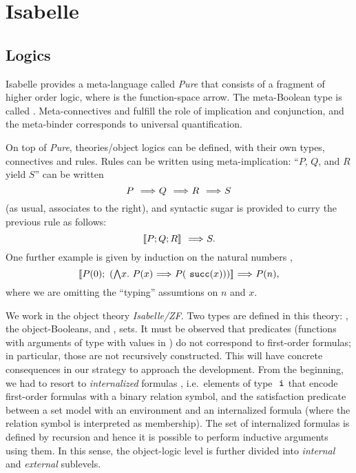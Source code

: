 \section{Isabelle}
\label{sec:isabelle}
\subsection{Logics}
\label{sec:logics}
Isabelle \cite{Isabelle,DBLP:books/sp/Paulson94} provides a
meta-language called \emph{Pure} that consists of a fragment of higher
order logic, where \isatt{\isasymRightarrow} is the function-space
arrow. The meta-Boolean type is called . Meta-connectives
\isatt{\isasymLongrightarrow} and \isatt{\&\&\&} fulfill the role of
implication and conjunction, and the meta-binder \isatt{\isasymAnd}
corresponds to universal quantification.

On top of \emph{Pure}, theories/object logics can be defined, with
their own types, connectives and rules. Rules can be written  using
meta-implication: ``$P$, $Q$, and $R$ yield $S$'' can be written
\[
P \ \isatt{\isasymLongrightarrow}\ Q\ \isatt{\isasymLongrightarrow}\ R\ \isatt{\isasymLongrightarrow}\ S
\]
(as usual,  \isatt{\isasymLongrightarrow} associates to the right), and
syntactic sugar is provided to curry the previous rule as follows:
\[
\isasymlbrakk P; Q; R \isasymrbrakk \ \isatt{\isasymLongrightarrow}\ S.
\]
One further example is given by induction on the natural numbers
,
\[
\isasymlbrakk P(0);\ (\textstyle\isasymAnd
x.\ P(x)\ \isasymLongrightarrow\ P(\isatt{succ}(x))) \isasymrbrakk
\ \isasymLongrightarrow\ P(n), 
\]
where we are omitting the ``typing'' assumtions on $n$ and $x$.

We work in the object theory \emph{Isabelle/ZF}. Two types are defined
in this theory: \tyo, the object-Booleans, and \tyi,
sets. 
It must be observed that predicates (functions with arguments of
type \tyi{} with values in \tyo) do not correspond to first-order formulas;
in particular, those are not recursively constructed.
This will
have concrete consequences in our strategy to approach the
development. From the beginning, we had to resort to
\emph{internalized} formulas \cite[Sect.~6]{paulson_2003}, i.e.\ elements of type $\tyi$ that
encode first-order formulas with a binary relation symbol, and the
satisfaction predicate   between a set
model with an environment and an internalized formula (where the
relation symbol is interpreted as membership). The set 
 of internalized
formulas is defined by recursion and hence it is possible to perform
inductive arguments using them. In this sense, the object-logic level
is further divided into \emph{internal} and \emph{external}
sublevels. 

